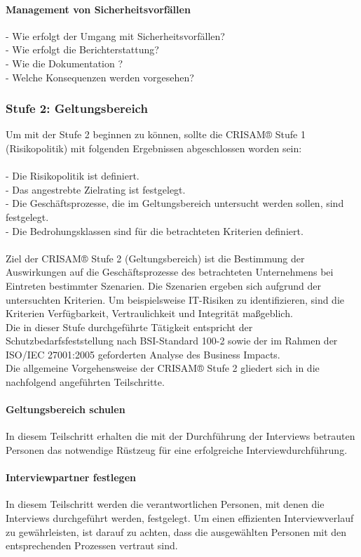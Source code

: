 \paragraph{Management von Sicherheitsvorfällen}
- Wie erfolgt der Umgang mit Sicherheitsvorfällen?
\\- Wie erfolgt die Berichterstattung?
\\- Wie die Dokumentation ?
\\- Welche Konsequenzen werden vorgesehen?
\newpage
\subsubsection {Stufe 2: Geltungsbereich}
Um mit der Stufe 2 beginnen zu können, sollte die CRISAM® Stufe 1 (Risikopolitik) mit folgenden Ergebnissen abgeschlossen worden sein:\\
\\- Die Risikopolitik ist definiert.
\\- Das angestrebte Zielrating ist festgelegt.
\\- Die Geschäftsprozesse, die im Geltungsbereich untersucht werden sollen, sind festgelegt.
\\- Die Bedrohungsklassen sind für die betrachteten Kriterien definiert.\\
\\
Ziel der CRISAM® Stufe 2 (Geltungsbereich) ist die Bestimmung der Auswirkungen auf die Geschäftsprozesse des betrachteten Unternehmens bei Eintreten bestimmter Szenarien. Die Szenarien ergeben sich aufgrund der untersuchten Kriterien. Um beispielsweise IT-Risiken zu identifizieren, sind die Kriterien Verfügbarkeit, Vertraulichkeit und Integrität maßgeblich.\\
Die in dieser Stufe durchgeführte Tätigkeit entspricht der Schutzbedarfsfeststellung nach BSI-Standard 100-2 sowie der im Rahmen der ISO/IEC 27001:2005 geforderten Analyse des Business Impacts.\\
Die allgemeine Vorgehensweise der CRISAM® Stufe 2 gliedert sich in die nachfolgend angeführten Teilschritte.
\paragraph{Geltungsbereich schulen}
In diesem Teilschritt erhalten die mit der Durchführung der Interviews betrauten Personen das notwendige Rüstzeug für eine erfolgreiche Interviewdurchführung.
\paragraph{Interviewpartner festlegen}
In diesem Teilschritt werden die verantwortlichen Personen, mit denen die Interviews durchgeführt werden, festgelegt. Um einen effizienten Interviewverlauf zu gewährleisten, ist darauf zu achten, dass die ausgewählten Personen mit den entsprechenden Prozessen vertraut sind.
